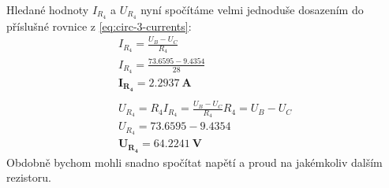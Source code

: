 Hledané hodnoty $I_{R_4}$ a $U_{R_4}$ nyní spočítáme velmi jednoduše dosazením do příslušné rovnice z \eqref{eq:circ-3-currents}:
\begin{gather*}
    I_{R_4} = \frac{U_B - U_C}{R_4} \\
    I_{R_4} = \frac{\num{73.6595}-\num{9.4354}}{28} \\
    \mathbf{I_{R_4} = \SI{2.2937}{\ampere}} \\
    \\
    U_{R_4} = R_4 I_{R_4} =  \frac{U_B - U_C}{R_4} R_4 = U_B - U_C \\
    U_{R_4} = \num{73.6595}-\num{9.4354} \\
    \mathbf{U_{R_4} = \SI{64.2241}{\volt}}
\end{gather*}
Obdobně bychom mohli snadno spočítat napětí a proud na jakémkoliv dalším rezistoru.
